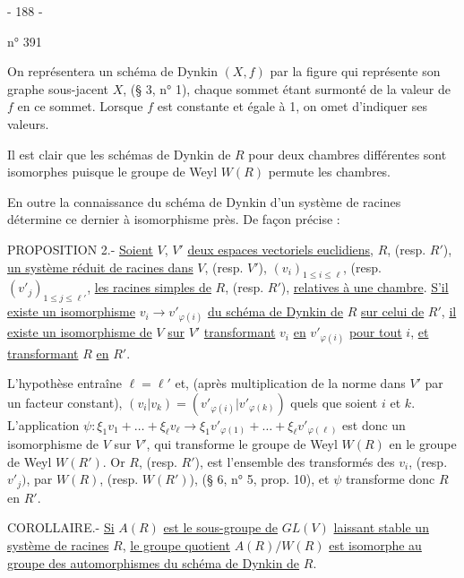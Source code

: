 \begin{center}- 188 -\end{center}
\hfill n° 391

On représentera un schéma de Dynkin $(X,f)$ par la figure qui représente son graphe sous-jacent $X$, (§ 3, n° 1), chaque sommet étant surmonté de la valeur de $f$ en ce sommet. Lorsque $f$ est constante et égale à 1, on omet d'indiquer ses valeurs.

Il est clair que les schémas de Dynkin de $R$ pour deux chambres différentes sont isomorphes puisque le groupe de Weyl $W(R)$ permute les chambres.

En outre la connaissance du schéma de Dynkin d'un système de racines détermine ce dernier à isomorphisme près. De façon précise :

PROPOSITION 2.- \uline{Soient} $V$, $V'$ \uline{deux espaces vectoriels euclidiens}, $R$, (resp. $R'$), \uline{un système réduit de racines dans} $V$, (resp. $V'$), $(v_i)_{1\leq i\leq\ell}$, (resp. $(v'_j)_{1\leq j\leq\ell'}$, \uline{les racines simples de} $R$, (resp. $R'$), \uline{relatives à une chambre}. \uline{S'il existe un isomorphisme} $v_i\longrightarrow v'_{\varphi(i)}$ \uline{du schéma de Dynkin de} $R$ \uline{sur celui de} $R'$, \uline{il existe un isomorphisme de} $V$ \uline{sur} $V'$ \uline{transformant} $v_i$ \uline{en} $v'_{\varphi(i)}$ \uline{pour tout} $i$, \uline{et transformant} $R$ \uline{en} $R'$.

L'hypothèse entraîne $\ell=\ell'$ et, (après multiplication de la norme dans $V'$ par un facteur constant), $(v_i|v_k)=(v'_{\varphi(i)}|v'_{\varphi(k)})$ quels que soient $i$ et $k$. L'application $\psi:\xi_1v_1+\ldots+\xi_\ell v_\ell\longrightarrow\xi_1v'_{\varphi(1)}+\ldots+\xi_\ell v'_{\varphi(\ell)}$ est donc un isomorphisme de $V$ sur $V'$, qui transforme le groupe de Weyl $W(R)$ en le groupe de Weyl $W(R')$. Or $R$, (resp. $R'$), est l'ensemble des transformés des $v_i$, (resp. $v'_j)$, par $W(R)$, (resp. $W(R')$), (§ 6, n° 5, prop. 10), et $\psi$ transforme donc $R$ en $R'$.

COROLLAIRE.- \uline{Si} $A(R)$ \uline{est le sous-groupe de} $GL(V)$ \uline{laissant stable un système de racines} $R$, \uline{le groupe quotient} $A(R)/W(R)$ \uline{est isomorphe au groupe des automorphismes du schéma de Dynkin de} $R$.
